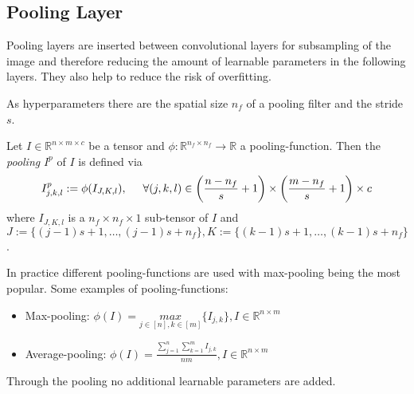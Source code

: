 \documentclass[a4paper, 12pt]{scrreprt} %
\begin{document}


\subsection{Pooling Layer}
\label{subsec:PL}
Pooling layers are inserted between convolutional layers for subsampling of the image and therefore reducing the amount of learnable parameters in the following layers. They also help to reduce the risk of overfitting.

As hyperparameters there are the spatial size $n_f$ of a pooling filter and the stride $s$.

\begin{definition}[Pooling]
Let $I \in \mathbb{R}^{n\times m \times c}$  be a tensor and $\phi : \mathbb{R}^{n_f \times n_f} \to \mathbb{R}$ a pooling-function. Then the \emph{pooling} $I^p$ of $I$ is defined via
\begin{equation*}
I^p_{j,k,l}:=\phi(I_{J,K,l}), \hspace{0.5cm} \forall (j,k,l) \in \left(\frac{n-n_f}{s}+1\right) \times \left(\frac{m-n_f}{s}+1\right) \times c
\end{equation*}
where $I_{J,K,l}$ is a $n_f \times n_f \times 1$ sub-tensor of $I$ and $J:=\{(j-1)s+1,\dots,(j-1)s+n_f\}, K:=\{(k-1)s+1,\dots,(k-1)s+n_f\}$.
\end{definition}


In practice different pooling-functions are used with max-pooling being the most popular. Some examples of pooling-functions:
\begin{itemize}
	\item Max-pooling: $\phi(I) = \underset{j \in [n],k \in [m]}{max}\{I_{j,k}\}, I\in \mathbb{R}^{n\times m}$ 
	\item Average-pooling: $\phi(I) = \frac{\sum\limits_{j=1}^{n}\sum\limits_{k=1}^{m}{I_{j,k}}}{nm}, I\in \mathbb{R}^{n\times m}$
\end{itemize}

Through the pooling no additional learnable parameters are added.
\end{document}
